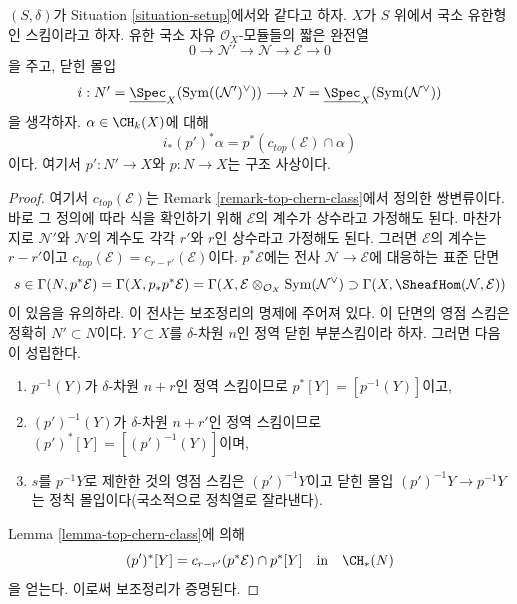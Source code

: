 \begin{lemma}
\label{lemma-easy-virtual-class}
$(S, \delta)$가 Situation \ref{situation-setup}에서와 같다고 하자.
$X$가 $S$ 위에서 국소 유한형인 스킴이라고 하자. 유한 국소 자유
$\mathcal{O}_X$-모듈들의 짧은 완전열
$$
0 \to \mathcal{N}' \to \mathcal{N} \to \mathcal{E} \to 0
$$
을 주고, 닫힌 몰입
$$
i :
N' = \underline{\Spec}_X(\text{Sym}((\mathcal{N}')^\vee))
\longrightarrow
N = \underline{\Spec}_X(\text{Sym}(\mathcal{N}^\vee))
$$
을 생각하자. $\alpha \in \CH_k(X)$에 대해
$$
i_*(p')^*\alpha = p^*(c_{top}(\mathcal{E}) \cap \alpha)
$$
이다. 여기서 $p' : N' \to X$와 $p : N \to X$는 구조 사상이다.
\end{lemma}

\begin{proof}
여기서 $c_{top}(\mathcal{E})$는 Remark
\ref{remark-top-chern-class}에서 정의한 쌍변류이다. 바로 그 정의에
따라 식을 확인하기 위해 $\mathcal{E}$의 계수가 상수라고 가정해도 된다.
마찬가지로 $\mathcal{N}'$와 $\mathcal{N}$의 계수도 각각 $r'$와
$r$인 상수라고 가정해도 된다. 그러면 $\mathcal{E}$의 계수는
$r - r'$이고
$c_{top}(\mathcal{E}) = c_{r - r'}(\mathcal{E})$이다.
$p^*\mathcal{E}$에는 전사 $\mathcal{N} \to \mathcal{E}$에 대응하는
표준 단면
$$
s \in \Gamma(N, p^*\mathcal{E}) = \Gamma(X, p_*p^*\mathcal{E}) =
\Gamma(X, \mathcal{E} \otimes_{\mathcal{O}_X} \text{Sym}(\mathcal{N}^\vee)
\supset \Gamma(X, \SheafHom(\mathcal{N}, \mathcal{E}))
$$
이 있음을 유의하라. 이 전사는 보조정리의 명제에 주어져 있다.
이 단면의 영점 스킴은 정확히 $N' \subset N$이다.
$Y \subset X$를 $\delta$-차원 $n$인 정역 닫힌 부분스킴이라 하자.
그러면 다음이 성립한다.
\begin{enumerate}
\item $p^{-1}(Y)$가 $\delta$-차원 $n + r$인 정역 스킴이므로
$p^*[Y] = [p^{-1}(Y)]$이고,
\item $(p')^{-1}(Y)$가 $\delta$-차원 $n + r'$인 정역 스킴이므로
$(p')^*[Y] = [(p')^{-1}(Y)]$이며,
\item $s$를 $p^{-1}Y$로 제한한 것의 영점 스킴은 $(p')^{-1}Y$이고
닫힌 몰입 $(p')^{-1}Y \to p^{-1}Y$는 정칙 몰입이다(국소적으로 정칙열로
잘라낸다).
\end{enumerate}
Lemma \ref{lemma-top-chern-class}에 의해
$$
(p')^*[Y] = c_{r - r'}(p^*\mathcal{E}) \cap p^*[Y]
\quad\text{in}\quad \CH_*(N)
$$
을 얻는다. 이로써 보조정리가 증명된다.
\end{proof}










